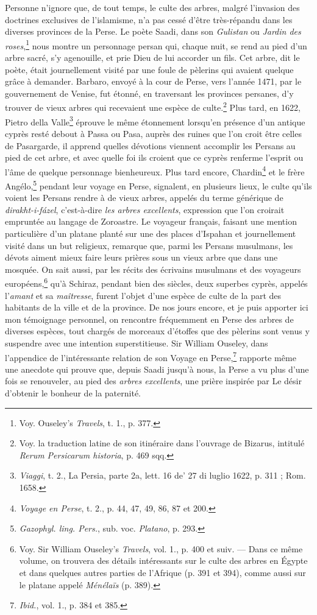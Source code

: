 \documentclass[a4paper, 11pt, oneside, polutonikogreek, french]{article}
\begin{document}
Personne n'ignore que, de tout temps, le culte des arbres, malgré l'invasion des doctrines exclusives de l'islamisme, n'a pas cessé d'être très-répandu dans les diverses provinces de la Perse. Le poète Saadi, dans son \emph{Gulistan} ou \emph{Jardin des roses},\footnote{Voy. Ouseley's \emph{Travels}, t. 1., p. 377.} nous montre un personnage persan qui, chaque nuit, se rend au pied d'un arbre sacré, s'y agenouille, et prie Dieu de lui accorder un fils. Cet arbre, dit le poète, était journellement visité par une foule de pèlerins qui avaient quelque grâce à demander. Barbaro, envoyé à la cour de Perse, vers l'année 1471, par le gouvernement de Venise, fut étonné, en traversant les provinces persanes, d'y trouver de vieux arbres qui recevaient une espèce de culte.\footnote{Voy. la traduction latine de son itinéraire dans l'ouvrage de Bizarus, intitulé \emph{Rerum Persicarum historia}, p. 469 sqq.} Plus tard, en 1622, Pietro della Valle\footnote{\emph{Viaggi}, t. 2., La Persia, parte 2a, lett. 16 de' 27 di luglio 1622, p. 311 ; Rom. 1658.} éprouve le même étonnement lorsqu'en présence d'un antique cyprès resté debout à Passa ou Pasa, auprès des ruines que l'on croit être celles de Pasargarde, il apprend quelles dévotions viennent accomplir les Persans au pied de cet arbre, et avec quelle foi ils croient que ce cyprès renferme l'esprit ou l'âme de quelque personnage bienheureux. Plus tard encore, Chardin\footnote{\emph{Voyage en Perse}, t. 2., p. 44, 47, 49, 86, 87 et 200.} et le frère Angélo,\footnote{\emph{Gazophyl. ling. Pers.}, sub. voc. \emph{Platano}, p. 293.} pendant leur voyage en Perse, signalent, en plusieurs lieux, le culte qu'ils voient les Persans rendre à de vieux arbres, appelés du terme générique de \emph{dirakht-i-fázel}, c'est-à-dire \emph{les arbres excellents}, expression que l'on croirait empruntée au langage de Zoroastre. Le voyageur français, faisant une mention particulière d'un platane planté sur une des places d'Ispahan et journellement visité dans un but religieux, remarque que, parmi les Persans musulmans, les dévots aiment mieux faire leurs prières sous un vieux arbre que dans une mosquée. On sait aussi, par les récits des écrivains musulmans et des voyageurs européens,\footnote{Voy. Sir William Ouseley's \emph{Travels}, vol. 1., p. 400 et suiv. --- Dans ce même volume, on trouvera des détails intéressants sur le culte des arbres en Égypte et dans quelques autres parties de l'Afrique (p. 391 et 394), comme aussi sur le platane appelé \emph{Ménélaïs} (p. 389).} qu'à Schiraz, pendant bien des siècles, deux superbes cyprès, appelés l'\emph{amant} et sa \emph{maîtresse}, furent l'objet d'une espèce de culte de la part des habitants de la ville et de la province. De nos jours encore, et je puis apporter ici mon témoignage personnel, on rencontre fréquemment en Perse des arbres de diverses espèces, tout chargés de morceaux d'étoffes que des pèlerins sont venus y suspendre avec une intention superstitieuse. Sir William Ouseley, dans l'appendice de l'intéressante relation de son Voyage en Perse,\footnote{\emph{Ibid.}, vol. 1., p. 384 et 385.} rapporte même une anecdote qui prouve que, depuis Saadi jusqu'à nous, la Perse a vu plus d'une fois se renouveler, au pied des \emph{arbres excellents}, une prière inspirée par Le désir d'obtenir le bonheur de la paternité.
\end{document}
